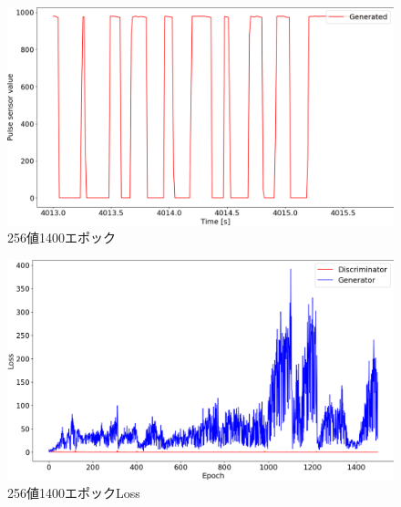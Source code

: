 \documentclass[a4j,10pt]{jarticle}
\begin{document}
\begin{figure}[h]
  \begin{center}
    \includegraphics[width=1\textwidth]{../research/pulse/figure/256_generated_1400epoch.png}
    \caption{256値1400エポック}
    \label{fig3}
  \end{center}
\end{figure}

\begin{figure}[h]
  \begin{center}
    \includegraphics[width=1\textwidth]{../research/pulse/figure/256_generated_1400epoch_loss.png}
    \caption{256値1400エポックLoss}
    \label{fig4}
  \end{center}
\end{figure}


\end{document}
